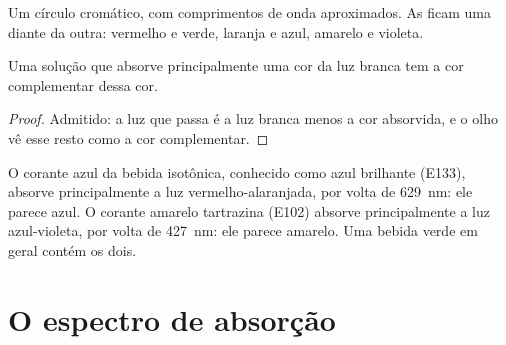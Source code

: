 \begin{omfigure}

{\small Um círculo cromático, com comprimentos de onda aproximados. As
 ficam uma diante da outra: vermelho e verde,
laranja e azul, amarelo e violeta.}
\end{omfigure}

\begin{proposition}\label{prop:g11:absorbance:colour-seen}
Uma solução que absorve principalmente uma cor da luz branca tem a cor
complementar dessa cor.
\end{proposition}

\begin{proof}
Admitido: a luz que passa é a luz branca menos a cor absorvida, e o olho
vê esse resto como a cor complementar.
\end{proof}

\begin{example}\label{ex:g11:absorbance:dyes}
O corante azul da bebida isotônica, conhecido como azul brilhante
(E133), absorve principalmente a luz vermelho-alaranjada, por volta de
\qty{629}{nm}: ele parece azul. O corante amarelo tartrazina (E102)
absorve principalmente a luz azul-violeta, por volta de \qty{427}{nm}:
ele parece amarelo. Uma bebida verde em geral contém os dois.
\end{example}

\section{O espectro de absorção}


